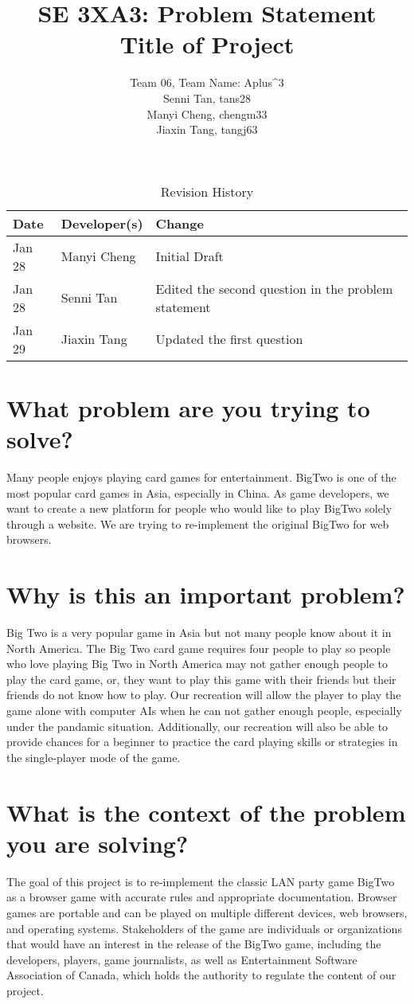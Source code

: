 \documentclass{article}
\title{SE 3XA3: Problem Statement\\Title of Project}
\author{Team 06, Team Name: Aplus^3
		\\ Senni Tan, tans28
		\\ Manyi Cheng, chengm33
		\\ Jiaxin Tang, tangj63
}
\date{}
\begin{document}
\begin{table}[hp]
\caption{Revision History} \label{TblRevisionHistory}
\begin{tabularx}{\textwidth}{llX}
\toprule
\textbf{Date} & \textbf{Developer(s)} & \textbf{Change}\\
\midrule
Jan 28 & Manyi Cheng & Initial Draft\\
Jan 28 & Senni Tan & Edited the second question in the problem statement\\
Jan 29 & Jiaxin Tang & Updated the first question\\
\bottomrule
\end{tabularx}
\end{table}

\newpage

\maketitle

\section{What problem are you trying to solve?
}
Many people enjoys playing card games for entertainment. BigTwo is one of the most popular card games in Asia, especially in China. As game developers, we want to create a new platform for people who would like to play BigTwo solely through a website. We are trying to re-implement the original BigTwo for web browsers.

\section{Why is this an important problem?}
Big Two is a very popular game in Asia but not many people know about it in North America. The Big Two card game requires four people to play so people who love playing Big Two in North America may not gather enough people to play the card game, or, they want to play this game with their friends but their friends do not know how to play. Our recreation will allow the player to play the game alone with computer AIs when he can not gather enough people, especially under the pandamic situation. Additionally, our recreation will also be able to provide chances for a beginner to practice the card playing skills or strategies in the single-player mode of the game.



\section{What is the context of the problem you are solving?}

The goal of this project is to re-implement the classic LAN party game BigTwo as a browser game with accurate rules and appropriate documentation. Browser games are portable and can be played on multiple different devices, web browsers, and operating systems. Stakeholders of the game are individuals or organizations that would have an interest in the release of the BigTwo game, including the developers, players, game journalists, as well as Entertainment Software Association of Canada, which holds the authority to regulate the content of our project.
\end{document}
